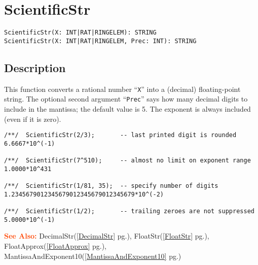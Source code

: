 \documentclass[a4paper]{mybook}
\newenvironment{command}{}{} %
\newcommand\SeeAlso{\par\textcolor{OrangeRed}{\textbf{\large See Also: }}}
\begin{document}
\section{ScientificStr}
\label{ScientificStr}
\begin{command} %


\begin{Verbatim}[label=syntax, rulecolor=\color{MidnightBlue},
frame=single]
ScientificStr(X: INT|RAT|RINGELEM): STRING
ScientificStr(X: INT|RAT|RINGELEM, Prec: INT): STRING
\end{Verbatim}


\subsection*{Description}

This function converts a rational number ``\verb&X&'' into a (decimal)
floating-point string.  The optional second argument ``\verb&Prec&'' says how many
decimal digits to include in the mantissa; the default value is 5.
The exponent is always included (even if it is zero).
\begin{Verbatim}[label=example, rulecolor=\color{PineGreen}, frame=single]
/**/  ScientificStr(2/3);       -- last printed digit is rounded
6.6667*10^(-1)

/**/  ScientificStr(7^510);     -- almost no limit on exponent range
1.0000*10^431

/**/  ScientificStr(1/81, 35);  -- specify number of digits
1.2345679012345679012345679012345679*10^(-2)

/**/  ScientificStr(1/2);       -- trailing zeroes are not suppressed
5.0000*10^(-1)
\end{Verbatim}


\SeeAlso %
  DecimalStr(\ref{DecimalStr} pg.\pageref{DecimalStr}), 
    FloatStr(\ref{FloatStr} pg.\pageref{FloatStr}), 
    FloatApprox(\ref{FloatApprox} pg.\pageref{FloatApprox}), 
    MantissaAndExponent10(\ref{MantissaAndExponent10} pg.\pageref{MantissaAndExponent10})
\end{command} %
\end{document}
